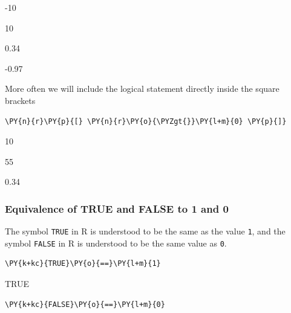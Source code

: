     \begin{enumerate*}
\item -10
\item 10
\item 0.34
\item -0.97
\end{enumerate*}


    
    More often we will include the logical statement directly inside the
square brackets

    \begin{tcolorbox}[breakable, size=fbox, boxrule=1pt, pad at break*=1mm,colback=cellbackground, colframe=cellborder]
\begin{Verbatim}[commandchars=\\\{\}]
\PY{n}{r}\PY{p}{[} \PY{n}{r}\PY{o}{\PYZgt{}}\PY{l+m}{0} \PY{p}{]}
\end{Verbatim}
\end{tcolorbox}

    \begin{enumerate*}
\item 10
\item 55
\item 0.34
\end{enumerate*}


    
    \hypertarget{equivalence-of-true-and-false-to-1-and-0}{%
\subsubsection{Equivalence of TRUE and FALSE to 1 and
0}\label{equivalence-of-true-and-false-to-1-and-0}}

    The symbol \texttt{TRUE} in R is understood to be the same as the value
\texttt{1}, and the symbol \texttt{FALSE} in R is understood to be the
same value as \texttt{0}.

    \begin{tcolorbox}[breakable, size=fbox, boxrule=1pt, pad at break*=1mm,colback=cellbackground, colframe=cellborder]
\begin{Verbatim}[commandchars=\\\{\}]
\PY{k+kc}{TRUE}\PY{o}{==}\PY{l+m}{1}
\end{Verbatim}
\end{tcolorbox}

    TRUE

    
    \begin{tcolorbox}[breakable, size=fbox, boxrule=1pt, pad at break*=1mm,colback=cellbackground, colframe=cellborder]
\begin{Verbatim}[commandchars=\\\{\}]
\PY{k+kc}{FALSE}\PY{o}{==}\PY{l+m}{0}
\end{Verbatim}
\end{tcolorbox}


